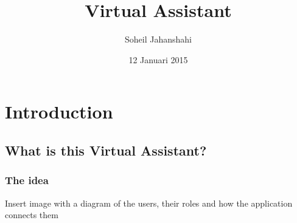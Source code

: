 \documentclass{beamer}
\title[Beamer Sample]{Virtual Assistant}
\institute[TU Delft]{Delft University of Technology Library}
\author{Soheil Jahanshahi}
\date{12 Januari 2015}
\newcommand{\field}[1]{\mathbb{#1}}
\newcommand{\Zset}{\field{Z}}
\begin{document}
{
%
\frame{\titlepage}
}

{
}

\section{Introduction}
\subsection{What is this Virtual Assistant?}

\begin{frame}\frametitle{The idea}
	Insert image with a diagram of the users, their roles and how the application connects them
\end{frame}

\end{document}
